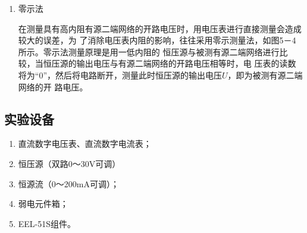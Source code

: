 \documentclass[UTF8]{article}
\begin{document}
\begin{enumerate}[label=\textbf{\arabic*}.]
\begin{enumerate}[label=(\textbf{\arabic*})]
\begin{adjustwidth}{0em}{0em}
\begin{minipage}[H]{0.4\textwidth}
                        \end{minipage}
                    \end{adjustwidth}
                    \item 零示法
                    \par
                    \noindent\hspace{2em}在测量具有高内阻有源二端网络的开路电压时，用电压表进行直接测量会造成较大的误差，为
                    了消除电压表内阻的影响，往往采用零示测量法，如图5－4所示。零示法测量原理是用一低内阻的
                    恒压源与被测有源二端网络进行比较，当恒压源的输出电压与有源二端网络的开路电压相等时，电
                    压表的读数将为“0”，然后将电路断开，测量此时恒压源的输出电压$U$，即为被测有源二端网络的开
                    路电压。
                \end{enumerate}
            \end{enumerate}
        \subsection{实验设备}
            \begin{enumerate}[label=\textbf{\arabic*}.]
                \item 直流数字电压表、直流数字电流表； 
                \item 恒压源（双路0～30V可调）
                \item 恒源流（0～200mA可调）； 
                \item 弱电元件箱；
                \item EEL-51S组件。
            \end{enumerate}
\end{document}
